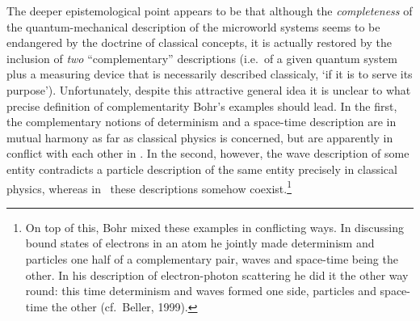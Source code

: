 \documentclass[12pt]{article}
\begin{document}
 The deeper epistemological point appears to be that although the {\it completeness} of the quantum-mechanical description of  the microworld systems seems to be endangered by the doctrine of classical concepts, it is actually restored by the inclusion of {\it two} ``complementary'' descriptions (i.e.\ of a given quantum system plus a measuring device that is necessarily described classicaly, `if it is to serve its purpose'). Unfortunately, despite this attractive general idea it is unclear to what precise definition of complementarity Bohr's examples should lead. In the first, the complementary notions of determinism and a space-time description are in mutual harmony as far as classical physics is concerned, but are apparently in conflict with each other in \qm. In the second, however, the wave description of some entity contradicts a particle description of the same entity precisely in classical physics, whereas in \qm\ these descriptions somehow coexist.\footnote{On top of this, Bohr mixed these examples in conflicting ways. In discussing bound states of electrons in an atom he jointly made determinism and particles one half of a complementary pair, waves and space-time being the other. In his description of electron-photon scattering he did it the other way round: this time determinism and waves formed one side, particles and space-time the other (cf.\ Beller, 1999).}
\end{document}
